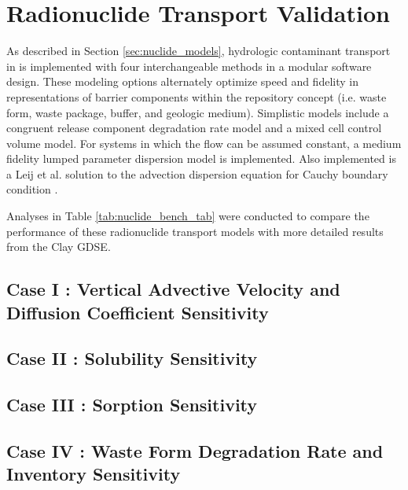 \section{Radionuclide Transport Validation}\label{sec:nuclide_benchmarks}

As described in Section \ref{sec:nuclide_models}, hydrologic contaminant 
transport in \Cyder is implemented with four interchangeable  methods in a 
modular software design. These modeling options alternately optimize speed and 
fidelity in representations of barrier components within the repository concept 
(i.e. waste form, waste package, buffer, and geologic medium)\cite{huff_hydrologic_2013}.  Simplistic models include a congruent 
release component degradation rate model and a mixed cell control volume model. For 
systems in which the flow can be assumed constant, a medium fidelity lumped 
parameter dispersion model is implemented. Also implemented is a Leij et al. 
solution to the advection dispersion equation for Cauchy boundary condition 
\cite{leij_analytical_1991, van_genuchten_analytical_1982}.  

Analyses in Table \ref{tab:nuclide_bench_tab} were conducted to compare the 
performance of these radionuclide transport models with more detailed results from the 
Clay \gls{GDSE}. 




%
\subsection{Case I : Vertical Advective Velocity and Diffusion Coefficient Sensitivity}

\FloatBarrier
\subsection{Case II : Solubility Sensitivity}

\FloatBarrier
\subsection{Case III : Sorption Sensitivity}

\FloatBarrier
\subsection{Case IV : Waste Form Degradation Rate and Inventory Sensitivity}

%
\FloatBarrier
